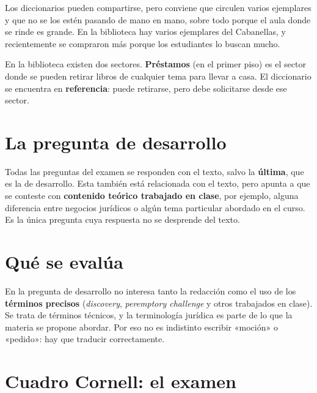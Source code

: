 \documentclass[12pt,oneside]{book}
\begin{document}
Los diccionarios pueden compartirse, pero conviene que circulen varios ejemplares y que no se los estén pasando de mano en mano, sobre todo porque el aula donde se rinde es grande. En la biblioteca hay varios ejemplares del Cabanellas, y recientemente se compraron más porque los estudiantes lo buscan mucho.

\begin{note}
En la biblioteca existen dos sectores. \textbf{Préstamos} (en el primer piso) es el sector donde se pueden retirar libros de cualquier tema para llevar a casa. El diccionario se encuentra en \textbf{referencia}: puede retirarse, pero debe solicitarse desde ese sector.
\end{note}

\section{La pregunta de desarrollo}

Todas las preguntas del examen se responden con el texto, salvo la \textbf{última}, que es la de desarrollo. Esta también está relacionada con el texto, pero apunta a que se conteste con \textbf{contenido teórico trabajado en clase}, por ejemplo, alguna diferencia entre negocios jurídicos o algún tema particular abordado en el curso. Es la única pregunta cuya respuesta no se desprende del texto.

\section{Qué se evalúa}

En la pregunta de desarrollo no interesa tanto la redacción como el uso de los \textbf{términos precisos} (\textit{discovery}, \textit{peremptory challenge} y otros trabajados en clase). Se trata de términos técnicos, y la terminología jurídica es parte de lo que la materia se propone abordar. Por eso no es indistinto escribir «moción» o «pedido»: hay que traducir correctamente.


\section{Cuadro Cornell: el examen}
\end{document}
